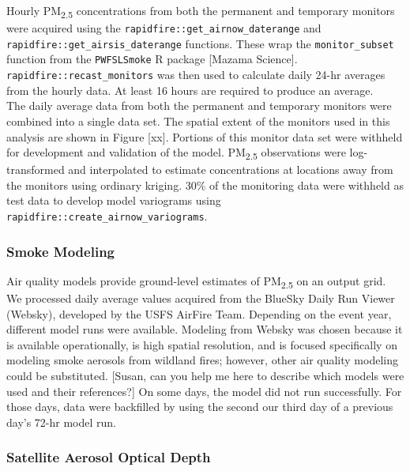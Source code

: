 \documentclass[gmd, manuscript]{copernicus}
\begin{document}
Hourly PM\textsubscript{2.5} concentrations from both the permanent and
temporary monitors were acquired using the
\texttt{rapidfire::get\_airnow\_daterange} and
\texttt{rapidfire::get\_airsis\_daterange} functions. These wrap the
\texttt{monitor\_subset} function from the \texttt{PWFSLSmoke} R package
{[}Mazama Science{]}. \texttt{rapidfire::recast\_monitors} was then used
to calculate daily 24-hr averages from the hourly data. At least 16
hours are required to produce an average.\\
The daily average data from both the permanent and temporary monitors
were combined into a single data set. The spatial extent of the monitors
used in this analysis are shown in Figure {[}xx{]}. Portions of this
monitor data set were withheld for development and validation of the
model. PM\textsubscript{2.5} observations were log-transformed and
interpolated to estimate concentrations at locations away from the
monitors using ordinary kriging. 30\% of the monitoring data were
withheld as test data to develop model variograms using
\texttt{rapidfire::create\_airnow\_variograms}.

\subsubsection{Smoke Modeling}

Air quality models provide ground-level estimates of
PM\textsubscript{2.5} on an output grid. We processed daily average
values acquired from the BlueSky Daily Run Viewer (Websky), developed by
the USFS AirFire Team. Depending on the event year, different model runs
were available. Modeling from Websky was chosen because it is available
operationally, is high spatial resolution, and is focused specifically
on modeling smoke aerosols from wildland fires; however, other air
quality modeling could be substituted. {[}Susan, can you help me here to
describe which models were used and their references?{]} On some days,
the model did not run successfully. For those days, data were backfilled
by using the second our third day of a previous day's 72-hr model run.

\subsubsection{Satellite Aerosol Optical Depth}
\end{document}
